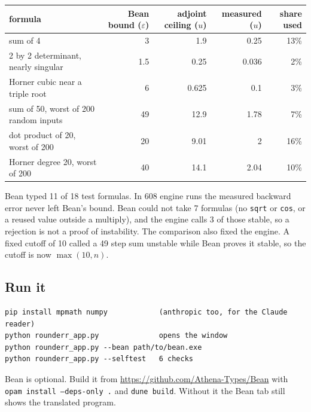 \documentclass[11pt]{article}
\begin{document}
\begin{center}
\begin{tabular}{@{}lrrrr@{}}
\toprule
formula & Bean bound ($\varepsilon$) & adjoint ceiling ($u$) & measured ($u$) & share used \\
\midrule
sum of 4 & 3 & 1.9 & 0.25 & 13\% \\
2 by 2 determinant, nearly singular & 1.5 & 0.25 & 0.036 & 2\% \\
Horner cubic near a triple root & 6 & 0.625 & 0.1 & 3\% \\
sum of 50, worst of 200 random inputs & 49 & 12.9 & 1.78 & 7\% \\
dot product of 20, worst of 200 & 20 & 9.01 & 2 & 16\% \\
Horner degree 20, worst of 200 & 40 & 14.1 & 2.04 & 10\% \\
\bottomrule
\end{tabular}
\end{center}
Bean typed 11 of 18 test formulas. In 608 engine runs the measured backward error never left Bean's bound. Bean could not take 7 formulas (no \texttt{sqrt} or \texttt{cos}, or a reused value outside a multiply), and the engine calls 3 of those stable, so a rejection is not a proof of instability. The comparison also fixed the engine. A fixed cutoff of 10 called a 49 step sum unstable while Bean proves it stable, so the cutoff is now $\max(10, n)$.

\subsection*{Run it}
\begin{lstlisting}
pip install mpmath numpy            (anthropic too, for the Claude reader)
python rounderr_app.py              opens the window
python rounderr_app.py --bean path/to/bean.exe
python rounderr_app.py --selftest   6 checks
\end{lstlisting}
Bean is optional. Build it from \url{https://github.com/Athena-Types/Bean} with \texttt{opam install --deps-only .} and \texttt{dune build}. Without it the Bean tab still shows the translated program.
\end{document}
